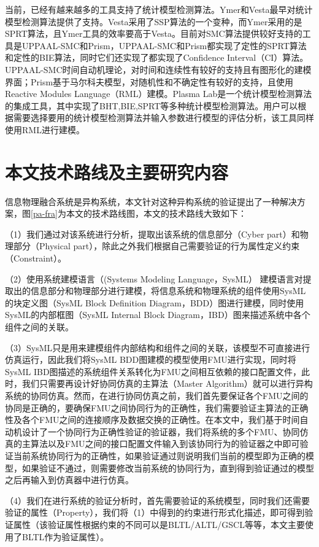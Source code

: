 当前，已经有越来越多的工具支持了统计模型检测算法。Ymer\cite{younes2005ymer}和Vesta\cite{sen2005vesta}最早对统计模型检测算法提供了支持。Vesta采用了SSP算法的一个变种，而Ymer采用的是SPRT算法，且Ymer工具的效率要高于Vesta。目前对SMC算法提供较好支持的工具是UPPAAL-SMC和Prism，UPPAAL-SMC和Prism都实现了定性的SPRT算法和定性的BIE算法，同时它们还实现了都实现了Confidence Interval（CI）\cite{brown2001interval}算法。UPPAAL-SMC时间自动机理论，对时间和连续性有较好的支持且有图形化的建模界面；Prism基于马尔科夫模型，对随机性和不确定性有较好的支持，且使用Reactive Modules Language（RML）建模。Plasma Lab\cite{boyer2013plasma}是一个统计模型检测算法的集成工具，其中实现了BHT,BIE,SPRT等多种统计模型检测算法。用户可以根据需要选择要用的统计模型检测算法并输入参数进行模型的评估分析，该工具同样使用RML进行建模。


\section{本文技术路线及主要研究内容}
信息物理融合系统是异构系统，本文针对这种异构系统的验证提出了一种解决方案，图\ref{pa-fra}为本文的技术路线图，本文的技术路线大致如下：

（1）我们通过对该系统进行分析，提取出该系统的信息部分（Cyber part）和物理部分（Physical part），除此之外我们根据自己需要验证的行为属性定义约束（Constraint）。

（2）使用系统建模语言（(Systems Modeling Language，SysML）\cite{Dori16} 建模语言对提取出的信息部分和物理部分进行建模，将信息系统和物理系统的组件使用SysML的块定义图（SysML Block Definition Diagram，BDD）图进行建模，同时使用SysML的内部框图（SysML Internal Block Diagram，IBD）图来描述系统中各个组件之间的关联。

（3）SysML只是用来建模组件内部结构和组件之间的关联，该模型不可直接进行仿真运行，因此我们将SysML BDD图建模的模型使用FMU进行实现，同时将SysML IBD图描述的系统组件关系转化为FMU之间相互依赖的接口配置文件，此时，我们只需要再设计好协同仿真的主算法（Master Algorithm）就可以进行异构系统的协同仿真。然而，在进行协同仿真之前，我们首先要保证各个FMU之间的协同是正确的，要确保FMU之间协同行为的正确性，我们需要验证主算法的正确性及各个FMU之间的连接顺序及数据交换的正确性。在本文中，我们基于时间自动机设计了一个协同行为正确性验证的验证器，我们将系统的多个FMU、协同仿真的主算法以及FMU之间的接口配置文件输入到该协同行为的验证器之中即可验证当前系统协同行为的正确性，如果验证通过则说明我们当前的模型即为正确的模型，如果验证不通过，则需要修改当前系统的协同行为，直到得到验证通过的模型之后再输入到仿真器中进行仿真。

（4）我们在进行系统的验证分析时，首先需要验证的系统模型，同时我们还需要验证的属性（Property），我们将（1）中得到的约束进行形式化描述，即可得到验证属性（该验证属性根据约束的不同可以是BLTL/ALTL/GSCL等等，本文主要使用了BLTL作为验证属性）。

